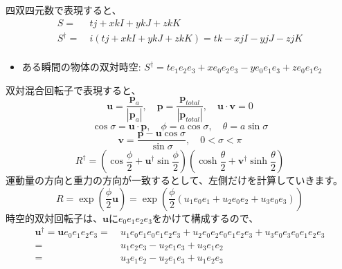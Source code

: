 \documentclass[a4paper,12pt,notitlepage]{jsreport}
\begin{document}
四双四元数で表現すると、
\begin{equation}
  \begin{split}
    S = ~ & t j + x kI + y kJ + z kK \\
    S^\dag = ~ & i(t j + x kI + y kJ + z kK) = t k - x jI - y jJ - z jK \\
  \end{split}
\end{equation}
\begin{itemize}
  \item ある瞬間の物体の双対時空: $ S^\dag = t e_1e_2e_3 + x e_0e_2e_3 - y e_0e_1e_3 + z e_0e_1e_2 $
\end{itemize}
双対混合回転子で表現すると、
\begin{equation}
  \bm{u} = \frac{\bm{p}_a}{|\bm{p}_a|}
  , \quad \bm{p} = \frac{\bm{p}_{total}}{|\bm{p}_{total}|}
  , \quad \bm{u} \cdot \bm{v} = 0
\end{equation}
\begin{equation}
  \cos \sigma = \bm{u} \cdot \bm{p}
  , \quad \phi = a \cos \sigma
  , \quad \theta = a \sin \sigma
\end{equation}
\begin{equation}
  \bm{v} = \frac{\bm{p} - \bm{u} \cos \sigma}{\sin \sigma}
  , \quad 0 < \sigma < \pi
\end{equation}
\begin{equation}
  R^\dag = \left(\cos \frac{\phi}{2} + \bm{u}^\dag \sin \frac{\phi}{2} \right)
  \left(\cosh \frac{\theta}{2} + \bm{v}^\dag \sinh \frac{\theta}{2} \right)
\end{equation}
運動量の方向と重力の方向が一致するとして、左側だけを計算していきます。
\begin{equation}
  R = \exp \left(\frac{\phi}{2} \bm{u} \right) 
  = \exp \left(\frac{\phi}{2} (u_1 e_0e_1 + u_2 e_0e_2 + u_3 e_0e_3) \right)
\end{equation}
時空的双対回転子は、$ \bm{u} $に$ e_0e_1e_2e_3 $をかけて構成するので、
\begin{equation}
  \begin{split}
    \bm{u}^\dag = \bm{u} e_0e_1e_2e_3 = ~ & u_1 e_0e_1e_0e_1e_2e_3 + u_2 e_0e_2e_0e_1e_2e_3 + u_3 e_0e_3e_0e_1e_2e_3 \\
    = ~ & u_1 e_2e_3 - u_2 e_1e_3 + u_3 e_1e_2 \\
    = ~ & u_3 e_1e_2 - u_2 e_1e_3 + u_1 e_2e_3 \\
  \end{split}
\end{equation}
\end{document}

